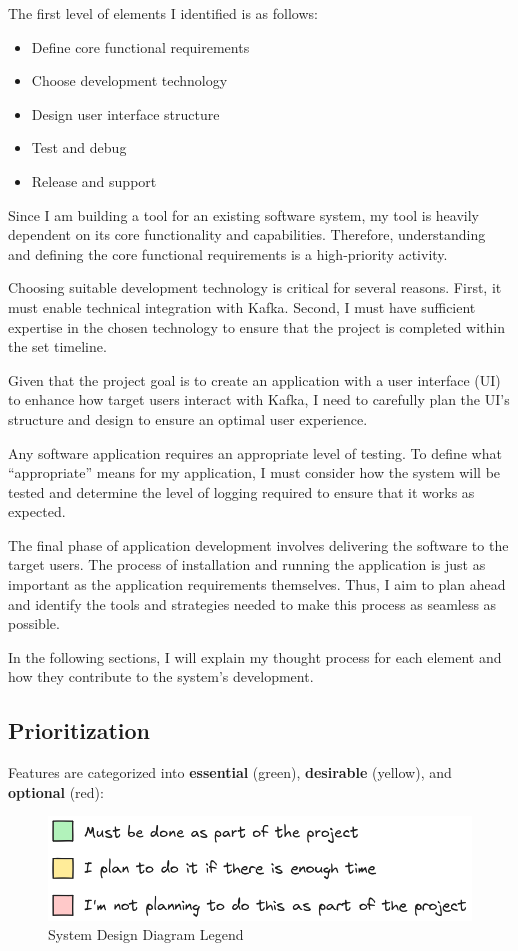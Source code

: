 \documentclass[10pt , a4paper]{report}
\begin{document}
The first level of elements I identified is as follows:
\begin{itemize}
    \item Define core functional requirements
    \item Choose development technology
    \item Design user interface structure
    \item Test and debug
    \item Release and support
\end{itemize}

Since I am building a tool for an existing software system, my tool is heavily dependent on its core functionality and capabilities. Therefore, understanding and defining the core functional requirements is a high-priority activity.

Choosing suitable development technology is critical for several reasons. First, it must enable technical integration with Kafka. Second, I must have sufficient expertise in the chosen technology to ensure that the project is completed within the set timeline.

Given that the project goal is to create an application with a user interface (UI) to enhance how target users interact with Kafka, I need to carefully plan the UI's structure and design to ensure an optimal user experience.

Any software application requires an appropriate level of testing. To define what ``appropriate'' means for my application, I must consider how the system will be tested and determine the level of logging required to ensure that it works as expected.

The final phase of application development involves delivering the software to the target users. The process of installation and running the application is just as important as the application requirements themselves. Thus, I aim to plan ahead and identify the tools and strategies needed to make this process as seamless as possible.

In the following sections, I will explain my thought process for each element and how they contribute to the system's development.

\newpage

\subsection{Prioritization}
Features are categorized into \textbf{essential} (green), \textbf{desirable} (yellow), and \textbf{optional} (red):
\begin{figure}[htbp]
    \centering
    \includegraphics[width=.6\linewidth]{imgs/DesignLegend.png}
    \caption{System Design Diagram Legend}
    \label{fig:design_legend}
\end{figure}
\end{document}
